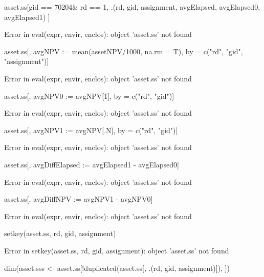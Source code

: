 \begin{Schunk}
\begin{Sinput}
asset.ss[gid == 70204& rd == 1, .(rd, gid, assignment, avgElapsed, avgElapsed0, avgElapsed1) ]
\end{Sinput}
\begin{Soutput}
Error in eval(expr, envir, enclos): object 'asset.ss' not found
\end{Soutput}
\begin{Sinput}
asset.ss[, avgNPV := mean(assetNPV/1000, na.rm = T), 
	by = c("rd", "gid", "assignment")]
\end{Sinput}
\begin{Soutput}
Error in eval(expr, envir, enclos): object 'asset.ss' not found
\end{Soutput}
\begin{Sinput}
asset.ss[, avgNPV0 := avgNPV[1], by = c("rd", "gid")]
\end{Sinput}
\begin{Soutput}
Error in eval(expr, envir, enclos): object 'asset.ss' not found
\end{Soutput}
\begin{Sinput}
asset.ss[, avgNPV1 := avgNPV[.N], by = c("rd", "gid")]
\end{Sinput}
\begin{Soutput}
Error in eval(expr, envir, enclos): object 'asset.ss' not found
\end{Soutput}
\begin{Sinput}
asset.ss[, avgDiffElapsed := avgElapsed1 - avgElapsed0]
\end{Sinput}
\begin{Soutput}
Error in eval(expr, envir, enclos): object 'asset.ss' not found
\end{Soutput}
\begin{Sinput}
asset.ss[, avgDiffNPV := avgNPV1 - avgNPV0]
\end{Sinput}
\begin{Soutput}
Error in eval(expr, envir, enclos): object 'asset.ss' not found
\end{Soutput}
\begin{Sinput}
setkey(asset.ss, rd, gid, assignment)
\end{Sinput}
\begin{Soutput}
Error in setkey(asset.ss, rd, gid, assignment): object 'asset.ss' not found
\end{Soutput}
\begin{Sinput}
dim(asset.sss <- asset.ss[!duplicated(asset.ss[, .(rd, gid, assignment)]), ])
\end{Sinput}
\begin{Soutput}

\end{Soutput}
\end{Schunk}
